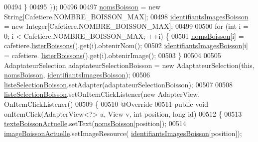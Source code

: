 \begin{DoxyCode}
00494             \}
00495         \});
00496 
00497         \hyperlink{classcom_1_1example_1_1ekawa_1_1_ihm_abafa700d1d1f943bd3e9678f698ed33a}{nomsBoisson} = \textcolor{keyword}{new} String[Cafetiere.NOMBRE\_BOISSON\_MAX];
00498         \hyperlink{classcom_1_1example_1_1ekawa_1_1_ihm_aab3ed36de15018dd29af2df4b3e150e4}{identifiantsImagesBoisson} = \textcolor{keyword}{new} Integer[Cafetiere.NOMBRE\_BOISSON\_MAX];
00499 
00500         \textcolor{keywordflow}{for} (\textcolor{keywordtype}{int} i = 0; i < Cafetiere.NOMBRE\_BOISSON\_MAX; ++i) \{
00501             \hyperlink{classcom_1_1example_1_1ekawa_1_1_ihm_abafa700d1d1f943bd3e9678f698ed33a}{nomsBoisson}[i] = cafetiere.\hyperlink{classcom_1_1example_1_1ekawa_1_1_cafetiere_a508a256d85a4e78c2b5c1a45899fcd99}{listerBoissons}().get(i).obtenirNom();
00502             \hyperlink{classcom_1_1example_1_1ekawa_1_1_ihm_aab3ed36de15018dd29af2df4b3e150e4}{identifiantsImagesBoisson}[i] = cafetiere.
      \hyperlink{classcom_1_1example_1_1ekawa_1_1_cafetiere_a508a256d85a4e78c2b5c1a45899fcd99}{listerBoissons}().get(i).obtenirImage();
00503         \}
00504 
00505         AdaptateurSelection adaptateurSelectionBoisson = \textcolor{keyword}{new} AdaptateurSelection(\textcolor{keyword}{this}, 
      \hyperlink{classcom_1_1example_1_1ekawa_1_1_ihm_abafa700d1d1f943bd3e9678f698ed33a}{nomsBoisson}, \hyperlink{classcom_1_1example_1_1ekawa_1_1_ihm_aab3ed36de15018dd29af2df4b3e150e4}{identifiantsImagesBoisson});
00506         \hyperlink{classcom_1_1example_1_1ekawa_1_1_ihm_a6f81eeec5d65c16e33b7ac67b4e771cb}{listeSelectionBoisson}.setAdapter(adaptateurSelectionBoisson);
00507 
00508         \hyperlink{classcom_1_1example_1_1ekawa_1_1_ihm_a6f81eeec5d65c16e33b7ac67b4e771cb}{listeSelectionBoisson}.setOnItemClickListener(\textcolor{keyword}{new} AdapterView.
      OnItemClickListener()
00509         \{
00510             @Override
00511             \textcolor{keyword}{public} \textcolor{keywordtype}{void} onItemClick(AdapterView<?> a, View v, \textcolor{keywordtype}{int} position, \textcolor{keywordtype}{long} \textcolor{keywordtype}{id})
00512             \{
00513                 \hyperlink{classcom_1_1example_1_1ekawa_1_1_ihm_a6655fee013d48228f2c7981f1cd8f74e}{texteBoissonActuelle}.setText(\hyperlink{classcom_1_1example_1_1ekawa_1_1_ihm_abafa700d1d1f943bd3e9678f698ed33a}{nomsBoisson}[position]);
00514                 \hyperlink{classcom_1_1example_1_1ekawa_1_1_ihm_a2d83809a52b5f9a97f7817ae183c456d}{imageBoissonActuelle}.setImageResource(
      \hyperlink{classcom_1_1example_1_1ekawa_1_1_ihm_aab3ed36de15018dd29af2df4b3e150e4}{identifiantsImagesBoisson}[position]);

\end{DoxyCode}
